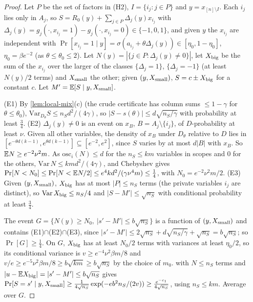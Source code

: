 \begin{proof}
Let $P$ be the set of factors in (H2), $I=\{i_j:j\in P\}$ and $y=x_{[n]\setminus I}$. Each $i_j$ lies
only in $A_j$, so $S=R_0(y)+\sum_{j\in P}\Delta_j(y)x_{i_j}$ with
$\Delta_j(y)=g_j(\cdot,x_{i_j}{=}1)-g_j(\cdot,x_{i_j}{=}0)\in\{-1,0,1\}$, and given $y$ the
$x_{i_j}$ are independent with $\Pr[x_{i_j}=1\mid y]=\sigma(a_{i_j}+\theta\Delta_j(y))\in
[\eta_0,1-\eta_0]$, $\eta_0=\beta e^{-2}$ (as $\theta\le\theta_0\le2$). Let $N(y)=|\{j\in P:\Delta_j(y)\ne0\}|$,
let $X_{\rm big}$ be the sum of the $x_{i_j}$ over the larger of the classes $\{\Delta_j=1\}$,
$\{\Delta_j=-1\}$ (at least $N(y)/2$ terms) and $X_{\rm small}$ the other; given $(y,X_{\rm
small})$, $S=c\pm X_{\rm big}$ for a constant $c$. Let $M'=\mathbb{E}[S\mid y,X_{\rm small}]$.

(E1) By \cref{lem:local-mix}(c) (the crude certificate has column sums $\le1-\gamma$ for
$\theta\le\theta_0$), $\mathrm{Var}_{D_\theta}S\le n_Sd^2/(4\gamma)$, so $|S-s(\theta)|\le d\sqrt{n_S/\gamma}$ with
probability at least $\frac34$.
(E2) $\Delta_j(y)\ne0$ is an event on $x_B$, $B=A_j\setminus\{i_j\}$, of $D$-probability at least
$\nu$. Given all other variables, the density of $x_B$ under $D_\theta$ relative to $D$ lies in
$[e^{-\theta d(k-1)},e^{\theta d(k-1)}]\subseteq[e^{-2},e^2]$, since $S$ varies by at most $d|B|$ with
$x_B$. So $\mathbb{E} N\ge e^{-2}\nu^2m$. As $\mathrm{osc}_i(N)\le d$ for the $n_S\le km$ variables in
scopes and $0$ for the others, $\mathrm{Var}\,N\le kmd^2/(4\gamma)$, and Chebyshev gives
$\Pr[N<N_0]\le\Pr[N<\mathbb{E} N/2]\le e^4kd^2/(\gamma\nu^4m)\le\frac14$, with $N_0=e^{-2}\nu^2m/2$.
(E3) Given $(y,X_{\rm small})$, $X_{\rm big}$ has at most $|P|\le n_S$ terms (the private variables
$i_j$ are distinct), so $\mathrm{Var}\,X_{\rm big}\le n_S/4$ and $|S-M'|\le\sqrt{n_S}$ with
conditional probability at least $\frac34$.

The event $G=\{N(y)\ge N_0,\ |s'-M'|\le b\sqrt{n_S}\}$ is a function of $(y,X_{\rm small})$ and
contains (E1)$\cap$(E2)$\cap$(E3), since $|s'-M'|\le2\sqrt{n_S}+d\sqrt{n_S/\gamma}+\sqrt{n_S}=b\sqrt{n_S}$;
so $\Pr[G]\ge\frac14$. On $G$, $X_{\rm big}$ has at least $N_0/2$ terms with variances at least
$\eta_0/2$, so its conditional variance is $v\ge e^{-4}\nu^2\beta m/8$ and
$v/e\ge e^{-5}\nu^2\beta m/8\ge b\sqrt{km}\ge b\sqrt{n_S}$ by the choice of $m_0$.
 with $N\le n_S$ terms and $|u-\mathbb{E} X_{\rm big}|=|s'-M'|\le b\sqrt{n_S}$ gives
$\Pr[S=s'\mid y,X_{\rm small}]\ge\frac1{4\sqrt{n_S}}\exp(-eb^2n_S/(2v))\ge\frac{e^{-c_1}}{4\sqrt{n_S}}$, using
$n_S\le km$. Average over $G$.
\end{proof}

